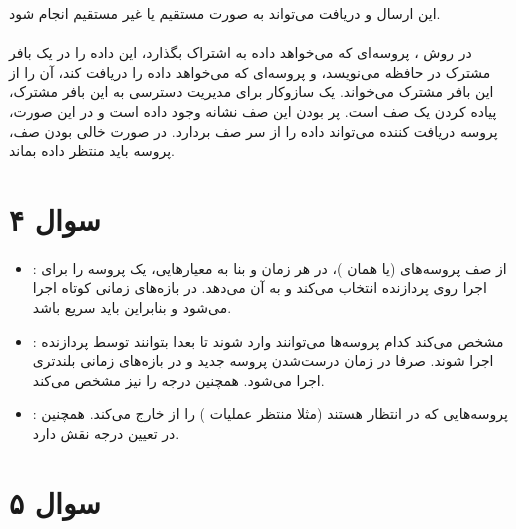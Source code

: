 \documentclass{article}
\begin{document}
	این ارسال و دریافت می‌تواند به صورت مستقیم یا غیر مستقیم انجام شود.

	\paragraph*{}
	در روش
	،
	پروسه‌ای که می‌خواهد داده به اشتراک بگذارد، این داده را در یک بافر مشترک در حافظه می‌نویسد، و پروسه‌ای که می‌خواهد داده را دریافت کند، آن را از این بافر مشترک می‌خواند. یک سازوکار برای مدیریت دسترسی به این بافر مشترک، پیاده کردن یک صف
	است. پر بودن این صف نشانه وجود داده است و در این صورت، پروسه دریافت کننده می‌تواند داده را از سر صف بردارد. در صورت خالی بودن صف، پروسه باید منتظر داده بماند.

	\section*{سوال ۴}
	\paragraph*{}
	\begin{itemize}
		\item{
			:
		}
		از صف پروسه‌های
		(یا همان
		)،
		در هر زمان و بنا به معیار‌هایی، یک پروسه را برای اجرا روی پردازنده انتخاب می‌کند و به آن
		می‌دهد. در بازه‌های زمانی کوتاه اجرا می‌شود و بنابراین باید سریع باشد.

		\item{
			:
		}
		مشخص می‌کند کدام پروسه‌ها می‌توانند وارد
		شوند تا بعدا بتوانند توسط پردازنده اجرا شوند. صرفا در زمان درست‌شدن پروسه جدید  و در بازه‌های زمانی بلندتری اجرا می‌شود. همچنین درجه
		را نیز مشخص می‌کند.

		\item{
			:
		}
		پروسه‌هایی که در انتظار هستند (مثلا منتظر عملیات
		)
		را از
		خارج می‌کند. همچنین در تعیین درجه
		نقش دارد.
	\end{itemize}

	\section*{سوال ۵}
	\paragraph*{}
\end{document}
